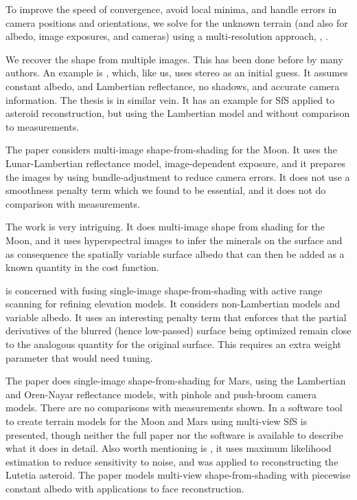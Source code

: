 \documentclass[12pt,oneside]{article}
\begin{document}
To improve the speed of convergence, avoid local minima, and handle
errors in camera positions and orientations, we solve for the unknown
terrain (and also for albedo, image exposures, and cameras) using a
multi-resolution approach, \cite{terzopoulos1984efficient},
\cite{crouzil2003multiresolution}.

We recover the shape from multiple images. This has been done before by
many authors. An example is \cite{wu2011high}, which, like us, uses
stereo as an initial guess. It assumes constant albedo, and Lambertian
reflectance, no shadows, and accurate camera information.  The thesis
\cite{lux2011multi} is in similar vein. It has an example for SfS
applied to asteroid reconstruction, but using the Lambertian model and
without comparison to measurements.

The paper \citet{lohse2006derivation} considers multi-image
shape-from-shading for the Moon. It uses the Lunar-Lambertian reflectance
model, image-dependent exposure, and it prepares the images by using
bundle-adjustment to reduce camera errors. It does not use a smoothness
penalty term which we found to be essential, and it does not do comparison with
measurements.

The work \cite{grumpe2011construction} is very intriguing. It does multi-image
shape from shading for the Moon, and it uses hyperspectral images to infer
the minerals on the surface and as consequence the spatially variable surface albedo
that can then be added as a known quantity in the cost function.

\cite{herbort2011reconstruction} is concerned with fusing single-image
shape-from-shading with active range scanning for refining elevation
models. It considers non-Lambertian models and variable albedo. It uses
an interesting penalty term that enforces that the partial derivatives
of the blurred (hence low-passed) surface being optimized remain close
to the analogous quantity for the original surface.  This requires an
extra weight parameter that would need tuning.

The paper \cite{o2012new} does single-image shape-from-shading for Mars,
using the Lambertian and Oren-Nayar reflectance models, with pinhole
and push-broom camera models. There are no comparisons with measurements
shown. In \cite{tyler2014merged} a software tool to create terrain models for
the Moon and Mars using multi-view SfS is presented, though neither the
full paper nor the software is available to describe what it does in
detail. Also worth mentioning is \cite{capanna2013three}, it uses
maximum likelihood estimation to reduce sensitivity to noise, and was
applied to reconstructing the Lutetia asteroid. The paper
\cite{samaras2000variable} models multi-view shape-from-shading with
piecewise constant albedo with applications to face reconstruction.
\end{document}
